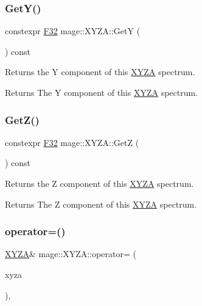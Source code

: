 \subsubsection{\texorpdfstring{Get\+Y()}{GetY()}}
{\footnotesize\ttfamily constexpr \mbox{\hyperlink{namespacemage_aa97e833b45f06d60a0a9c4fc22ae02c0}{F32}} mage\+::\+X\+Y\+Z\+A\+::\+GetY (\begin{DoxyParamCaption}{ }\end{DoxyParamCaption}) const\hspace{0.3cm}{\ttfamily [noexcept]}}

Returns the Y component of this \mbox{\hyperlink{structmage_1_1_x_y_z_a}{X\+Y\+ZA}} spectrum.

\begin{DoxyReturn}{Returns}
The Y component of this \mbox{\hyperlink{structmage_1_1_x_y_z_a}{X\+Y\+ZA}} spectrum. 
\end{DoxyReturn}
\mbox{\label{structmage_1_1_x_y_z_a_a951b69d9024672c0d59f81e15c9f7f6b}} 
\subsubsection{\texorpdfstring{Get\+Z()}{GetZ()}}
{\footnotesize\ttfamily constexpr \mbox{\hyperlink{namespacemage_aa97e833b45f06d60a0a9c4fc22ae02c0}{F32}} mage\+::\+X\+Y\+Z\+A\+::\+GetZ (\begin{DoxyParamCaption}{ }\end{DoxyParamCaption}) const\hspace{0.3cm}{\ttfamily [noexcept]}}

Returns the Z component of this \mbox{\hyperlink{structmage_1_1_x_y_z_a}{X\+Y\+ZA}} spectrum.

\begin{DoxyReturn}{Returns}
The Z component of this \mbox{\hyperlink{structmage_1_1_x_y_z_a}{X\+Y\+ZA}} spectrum. 
\end{DoxyReturn}
\mbox{\label{structmage_1_1_x_y_z_a_a203b9033f20f1d47d654e3bba2e2a62f}} 
\subsubsection{\texorpdfstring{operator=()}{operator=()}\hspace{0.1cm}{\footnotesize\ttfamily [1/2]}}
{\footnotesize\ttfamily \mbox{\hyperlink{structmage_1_1_x_y_z_a}{X\+Y\+ZA}}\& mage\+::\+X\+Y\+Z\+A\+::operator= (\begin{DoxyParamCaption}\item[{const \mbox{\hyperlink{structmage_1_1_x_y_z_a}{X\+Y\+ZA}} \&}]{xyza }\end{DoxyParamCaption})\hspace{0.3cm}{\ttfamily [default]}, {\ttfamily [noexcept]}}

